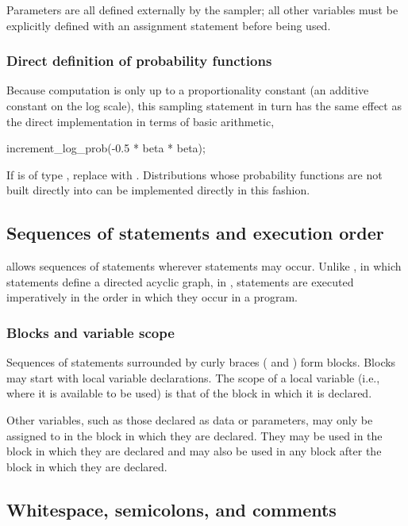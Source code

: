 \documentclass[article]{jss}
\begin{document}
Parameters are all defined externally by the sampler; all other
variables must be explicitly defined with an assignment statement
before being used.


\subsubsection{Direct definition of probability functions}

Because computation is only up to a proportionality constant (an
additive constant on the log scale), this sampling statement in turn
has the same effect as the direct implementation in terms of basic
arithmetic,
%
\begin{Code}
increment_log_prob(-0.5 * beta * beta);
\end{Code}
%
If  is of type , replace 
with .  Distributions whose probability functions
are not built directly into  can be implemented
directly in this fashion.



\subsection{Sequences of statements and execution order}

 allows sequences of statements wherever statements may
occur. Unlike , in which statements define a directed
acyclic graph, in , statements are executed
imperatively in the order in which they occur in a program.

\subsubsection{Blocks and variable scope}

Sequences of statements surrounded by curly braces (\code{\{} and
\code{\}}) form blocks.  Blocks may start with local variable
declarations.  The scope of a local variable (i.e., where it is
available to be used) is that of the block in which it is declared.

Other variables, such as those declared as data or parameters, may
only be assigned to in the block in which they are declared.  They may
be used in the block in which they are declared and may also be used
in any block after the block in which they are declared.


\subsection{Whitespace, semicolons, and comments}
\end{document}
